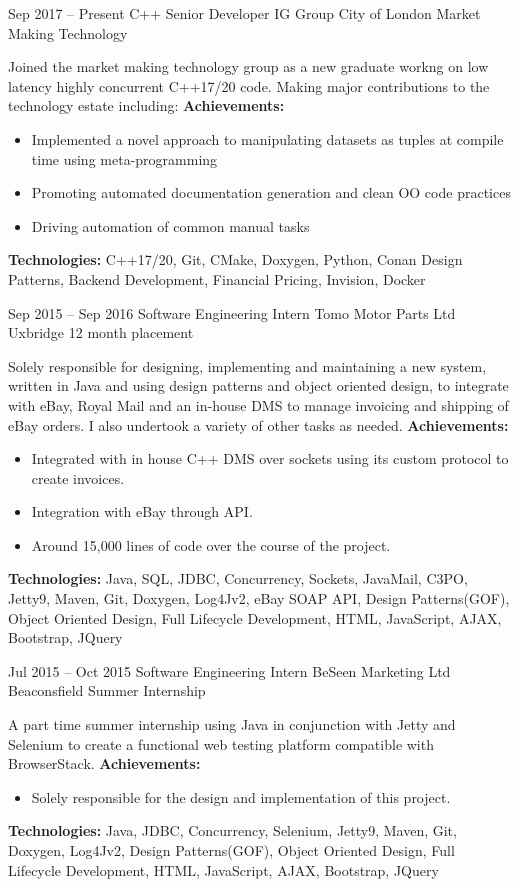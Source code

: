 \cventry
{Sep 2017 -- Present}
{C++ Senior Developer}
{IG Group}
{City of London}
{Market Making Technology}
{Joined the market making technology group as a new graduate workng on low latency
highly concurrent C++17/20 code. Making major contributions to the technology estate
including: \newline{}
\textbf{Achievements:}
	{\begin{itemize}
		\item{Implemented a novel approach to manipulating datasets as tuples at
              compile time using meta-programming}
		\item{Promoting automated documentation generation and clean OO code practices}
		\item{Driving automation of common manual tasks}
	\end{itemize}}
\textbf{Technologies:} {\scriptsize C++17/20, Git, CMake, Doxygen, Python, Conan
Design Patterns, Backend Development, Financial Pricing, Invision, Docker\newline{} }
}

\cventry
{Sep 2015 -- Sep 2016}
{Software Engineering Intern}
{Tomo Motor Parts Ltd}
{Uxbridge}
{12 month placement}
{Solely responsible for designing, implementing and maintaining a new system, 
written in Java and using design patterns and object oriented design, to 
integrate with eBay, Royal Mail and an in-house DMS to manage invoicing and 
shipping of eBay orders. I also undertook a variety of other tasks as needed.\newline{}
\textbf{Achievements:}
	{\begin{itemize}
		\item{Integrated with in house C++ DMS over sockets using its custom 
        protocol to create invoices.}
		\item{Integration with eBay through API.}
		\item{Around 15,000 lines of code over the course of the project.}
	\end{itemize}}
\textbf{Technologies:} {\scriptsize Java, SQL, JDBC, Concurrency, Sockets, 
JavaMail, C3PO, Jetty9, Maven, Git, Doxygen, Log4Jv2, eBay SOAP API, Design 
Patterns(GOF), Object Oriented Design, Full Lifecycle Development, HTML, 
JavaScript, AJAX, Bootstrap, JQuery\newline{} }
}


\cventry
{Jul 2015 -- Oct 2015}
{Software Engineering Intern}
{BeSeen Marketing Ltd}
{Beaconsfield}
{Summer Internship}
{A part time summer internship using Java in conjunction with Jetty and 
Selenium to create a functional web testing platform compatible with BrowserStack.\newline{}
\textbf{Achievements:}
	{\begin{itemize}
		\item{Solely responsible for the design and implementation of this project.}
	\end{itemize}}
\textbf{Technologies:} {\scriptsize Java, JDBC, Concurrency, Selenium, Jetty9, 
Maven, Git, Doxygen, Log4Jv2, Design Patterns(GOF), Object Oriented Design, 
Full Lifecycle Development, HTML, JavaScript, AJAX, Bootstrap, JQuery\newline{} }}

